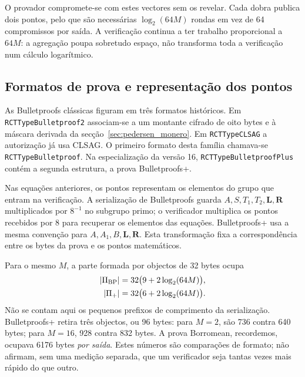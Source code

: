 O provador compromete-se com estes vectores sem os revelar. Cada dobra publica
dois pontos, pelo que são necessárias \(\log_2(64M)\) rondas em vez de 64
compromissos por saída. A verificação continua a ter trabalho proporcional a
\(64M\): a agregação poupa sobretudo espaço, não transforma toda a verificação
num cálculo logarítmico.

\subsection{Formatos de prova e representação dos pontos}

As Bulletproofs clássicas figuram em três formatos históricos.
Em \texttt{RCTTypeBulletproof2} associam-se a um montante cifrado
de oito bytes e à máscara derivada da secção~\ref{sec:pedersen_monero}.
Em \texttt{RCTTypeCLSAG} a autorização já usa CLSAG. O primeiro
formato desta família chamava-se \texttt{RCTTypeBulletproof}.
Na especialização da versão 16, \texttt{RCTTypeBulletproofPlus}
contém a segunda estrutura, a prova Bulletproofs+.

Nas equações anteriores, os pontos representam os elementos do grupo que
entram na verificação. A serialização de Bulletproofs guarda
\(A,S,T_1,T_2,\boldsymbol L,\boldsymbol R\) multiplicados por
\(8^{-1}\) no subgrupo primo; o verificador multiplica os pontos recebidos
por 8 para recuperar os elementos das equações. Bulletproofs+ usa a mesma
convenção para \(A,A_1,B,\boldsymbol L,\boldsymbol R\). Esta transformação
fixa a correspondência entre os bytes da prova e os pontos matemáticos.

%
Para o mesmo \(M\), a parte formada por objectos de 32 bytes ocupa
\begin{align}
 \lvert\Pi_{\rm BP}\rvert
   &=32\bigl(9+2\log_2(64M)\bigr),\label{eq:bp-size}\\
 \lvert\Pi_{+}\rvert
   &=32\bigl(6+2\log_2(64M)\bigr).\label{eq:bpp-size}
\end{align}
Não se contam aqui os pequenos prefixos de comprimento da serialização.
Bulletproofs+ retira três objectos, ou 96 bytes: para \(M=2\), são 736 contra
640 bytes; para \(M=16\), 928 contra 832 bytes. A prova Borromean, recordemos,
ocupava 6176 bytes \emph{por saída}. Estes números são comparações de formato;
não afirmam, sem uma medição separada, que um verificador seja tantas vezes
mais rápido do que outro.


